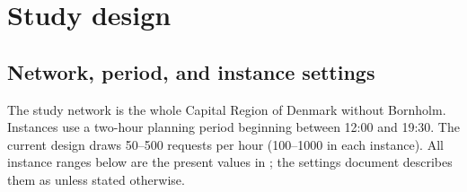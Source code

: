 \section{Study design}

\subsection{Network, period, and instance settings}

The study network is the whole Capital Region of Denmark without Bornholm.
Instances use a two-hour planning period beginning between 12:00 and 19:30.
The current design draws 50--500 requests per hour (100--1000 in each
instance). All instance ranges below are the present values in
; the settings document describes them as
\tagprop unless stated otherwise.

